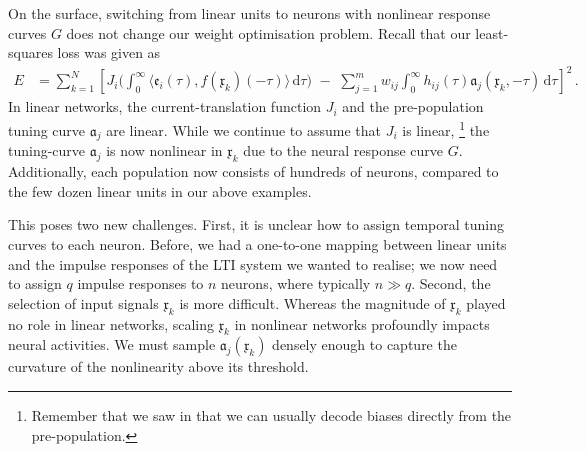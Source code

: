 On the surface, switching from linear units to neurons with nonlinear response curves $G$ does not change our weight optimisation problem.
Recall that our least-squares loss was given as
\begin{align}
	E &= \sum_{k = 1}^N \left[
		J_i \Big( \! \int_0^\infty \!\!\! \big\langle \mathfrak{e}_i(\tau), f(\mathfrak{x}_k)(-\tau) \big\rangle \, \mathrm{d}\tau \Big) \,\,-\,\,
		\sum_{j = 1}^m w_{ij} \! \int_0^\infty \!\!\! h_{ij}(\tau) \mathfrak{a}_j(\mathfrak{x}_k, -\tau) \,\mathrm{d}\tau
	\right]^2 \,.
	\tag{4.7}
\end{align}
In linear networks, the current-translation function $J_i$ and the pre-population tuning curve $\mathfrak{a}_j$ are linear.
While we continue to assume that $J_i$ is linear,%
\footnote{
Remember that we saw in  that we can usually decode biases directly from the pre-population.
}
the tuning-curve $\mathfrak{a}_j$ is now nonlinear in $\mathfrak{x}_k$ due to the neural response curve $G$.
Additionally, each population now consists of hundreds of neurons, compared to the few dozen linear units in our above examples.

This poses two new challenges.
First, it is unclear how to assign temporal tuning curves to each neuron.
Before, we had a one-to-one mapping between linear units and the impulse responses of the LTI system we wanted to realise; we now need to assign $q$ impulse responses to $n$ neurons, where typically $n \gg q$.
Second, the selection of input signals $\mathfrak{x}_k$ is more difficult.
Whereas the magnitude of $\mathfrak{x}_k$ played no role in linear networks, scaling $\mathfrak{x}_k$ in nonlinear networks profoundly impacts neural activities.
We must sample $\mathfrak{a}_j(\mathfrak{x}_k)$ densely enough to capture the curvature of the nonlinearity above its threshold.


